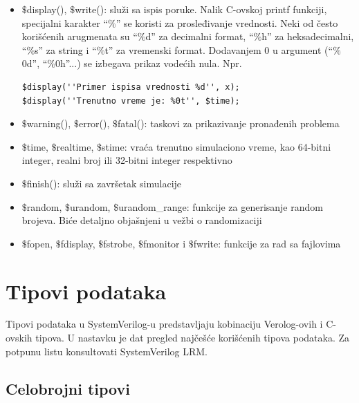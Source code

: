 \begin{itemize}
\item \(\$\)display(), \(\$\)write():
  služi sa ispis poruke. Nalik C-ovskoj printf funkciji, specijalni karakter
  ``\(\%\)'' se koristi za prosleđivanje vrednosti. Neki od često korišćenih
  arugmenata su ``\(\%\)d'' za decimalni format, ``\(\%\)h'' za heksadecimalni,
  ``\(\%\)s'' za string i ``\(\%\)t'' za vremenski format. Dodavanjem 0 u
  argument (``\(\%\)0d'', ``\(\%\)0h''...) se izbegava prikaz vodećih nula. Npr.
\begin{lstlisting}
$display(''Primer ispisa vrednosti %d'', x);
$display(''Trenutno vreme je: %0t'', $time);
\end{lstlisting}
\item \(\$\)warning(), \(\$\)error(), \(\$\)fatal():
  taskovi za prikazivanje pronađenih problema
\item \(\$\)time, \(\$\)realtime, \(\$\)stime:
  vraća trenutno simulaciono vreme, kao 64-bitni integer, realni broj ili
  32-bitni integer respektivno
\item \(\$\)finish():
  služi sa završetak simulacije
\item \(\$\)random, \(\$\)urandom, \(\$\)urandom\_range:
  funkcije za generisanje random brojeva. Biće detaljno objašnjeni u vežbi o
  randomizaciji
\item \(\$\)fopen, \(\$\)fdisplay, \(\$\)fstrobe, \(\$\)fmonitor i \(\$\)fwrite:
  funkcije za rad sa fajlovima
\end{itemize}


\section{Tipovi podataka}

Tipovi podataka u SystemVerilog-u predstavljaju kobinaciju Verolog-ovih i
C-ovskih tipova. U nastavku je dat pregled najčešće korišćenih tipova podataka.
Za potpunu listu konsultovati SystemVerilog LRM.


\subsection{Celobrojni tipovi}

